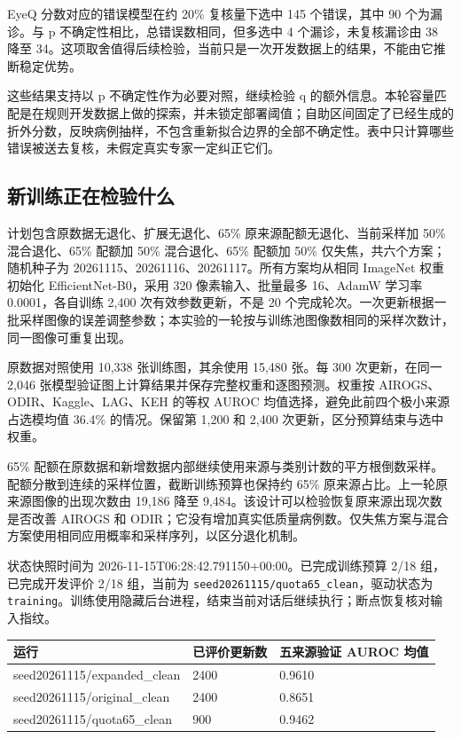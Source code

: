 \documentclass[
  10pt,
]{article}
\begin{document}
EyeQ 分数对应的错误模型在约 20\% 复核量下选中 145 个错误，其中 90
个为漏诊。与 p 不确定性相比，总错误数相同，但多选中 4
个漏诊，未复核漏诊由 38 降至
34。这项取舍值得后续检验，当前只是一次开发数据上的结果，不能由它推断稳定优势。

这些结果支持以 p 不确定性作为必要对照，继续检验 q
的额外信息。本轮容量匹配是在规则开发数据上做的探索，并未锁定部署阈值；自助区间固定了已经生成的折外分数，反映病例抽样，不包含重新拟合边界的全部不确定性。表中只计算哪些错误被送去复核，未假定真实专家一定纠正它们。

\subsection{新训练正在检验什么}\label{ux65b0ux8badux7ec3ux6b63ux5728ux68c0ux9a8cux4ec0ux4e48}

计划包含原数据无退化、扩展无退化、65\% 原来源配额无退化、当前采样加 50\%
混合退化、65\% 配额加 50\% 混合退化、65\% 配额加 50\%
仅失焦，共六个方案；随机种子为
20261115、20261116、20261117。所有方案均从相同 ImageNet 权重初始化
EfficientNet-B0，采用 320 像素输入、批量最多 16、AdamW 学习率
0.0001，各自训练 2,400 次有效参数更新，不是 20
个完成轮次。一次更新根据一批采样图像的误差调整参数；本实验的一轮按与训练池图像数相同的采样次数计，同一图像可重复出现。

原数据对照使用 10,338 张训练图，其余使用 15,480 张。每 300
次更新，在同一 2,046
张模型验证图上计算结果并保存完整权重和逐图预测。权重按
AIROGS、ODIR、Kaggle、LAG、KEH 的等权 AUROC
均值选择，避免此前四个极小来源占选模均值 36.4\% 的情况。保留第 1,200 和
2,400 次更新，区分预算结束与选中权重。

65\%
配额在原数据和新增数据内部继续使用来源与类别计数的平方根倒数采样。配额分散到连续的采样位置，截断训练预算也保持约
65\% 原来源占比。上一轮原来源图像的出现次数由 19,186 降至
9,484。该设计可以检验恢复原来源出现次数是否改善 AIROGS 和
ODIR；它没有增加真实低质量病例数。仅失焦方案与混合方案使用相同应用概率和采样序列，以区分退化机制。

状态快照时间为 2026-11-15T06:28:42.791150+00:00。已完成训练预算 2/18
组，已完成开发评价 2/18 组，当前为
\texttt{seed20261115/quota65\_clean}，驱动状态为
\texttt{training}。训练使用隐藏后台进程，结束当前对话后继续执行；断点恢复核对输入指纹。

\begin{longtable}[]{@{}lll@{}}
\toprule\noalign{}
运行 & 已评价更新数 & 五来源验证 AUROC 均值 \\
\midrule\noalign{}
\endhead
\bottomrule\noalign{}
\endlastfoot
seed20261115/expanded\_clean & 2400 & 0.9610 \\
seed20261115/original\_clean & 2400 & 0.8651 \\
seed20261115/quota65\_clean & 900 & 0.9462 \\
\end{longtable}
\end{document}
